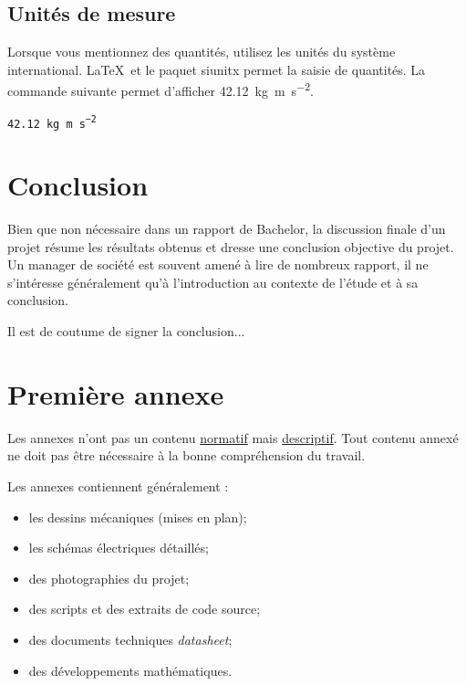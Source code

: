 \documentclass[
    iai, %
    eai, %
]{heig-tb}
\begin{document}
\section{Unités de mesure}

Lorsque vous mentionnez des quantités, utilisez les unités du système international. \LaTeX~et le paquet \textsf{siunitx} permet la saisie de quantités. La commande suivante permet d'afficher \SI{42.12}{\kilo\gram\metre\per\square\second}.\par

\texttt{\SI{42.12}{\kilo\gram\metre\per\square\second}}\par

\chapter{Conclusion}

Bien que non nécessaire dans un rapport de Bachelor, la discussion finale d'un projet résume les résultats obtenus et dresse une conclusion objective du projet. Un manager de société est souvent amené à lire de nombreux rapport, il ne s'intéresse généralement qu'à l'introduction au contexte de l'étude et à sa conclusion.

Il est de coutume de signer la conclusion...

\vfil
\hspace{8cm}\makeatletter\@author\makeatother\par
\hspace{8cm}\begin{minipage}{5cm}
    \printsignature
\end{minipage}
\clearpage

\appendix
\appendixpage
\addappheadtotoc

\chapter{Première annexe}

Les annexes n'ont pas un contenu \underline{normatif} mais \underline{descriptif}. Tout contenu annexé ne doit pas être nécessaire à la bonne compréhension du travail.

Les annexes contiennent généralement :

\begin{itemize}
    \item les dessins mécaniques (mises en plan);
    \item les schémas électriques détaillés;
    \item des photographies du projet;
    \item des scripts et des extraits de code source;
    \item des documents techniques \pex \emph{datasheet};
    \item des développements mathématiques.
\end{itemize}
\end{document}
